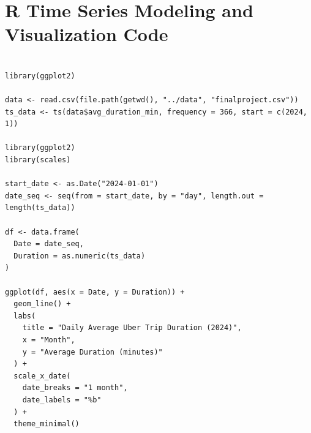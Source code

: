 \documentclass{article}
\begin{document}
\section{R Time Series Modeling and Visualization Code}
\label{appendix:rcode}
\begin{lstlisting}[style=rstyle, caption={Loading and Plotting Time Series}, label={lst:r_ts_plot}]

library(ggplot2)

data <- read.csv(file.path(getwd(), "../data", "finalproject.csv"))
ts_data <- ts(data$avg_duration_min, frequency = 366, start = c(2024, 1))

library(ggplot2)
library(scales)

start_date <- as.Date("2024-01-01")
date_seq <- seq(from = start_date, by = "day", length.out = length(ts_data))

df <- data.frame(
  Date = date_seq,
  Duration = as.numeric(ts_data)
)

ggplot(df, aes(x = Date, y = Duration)) +
  geom_line() +
  labs(
    title = "Daily Average Uber Trip Duration (2024)",
    x = "Month",
    y = "Average Duration (minutes)"
  ) +
  scale_x_date(
    date_breaks = "1 month",
    date_labels = "%b"
  ) +
  theme_minimal()
\end{lstlisting}
\end{document}
